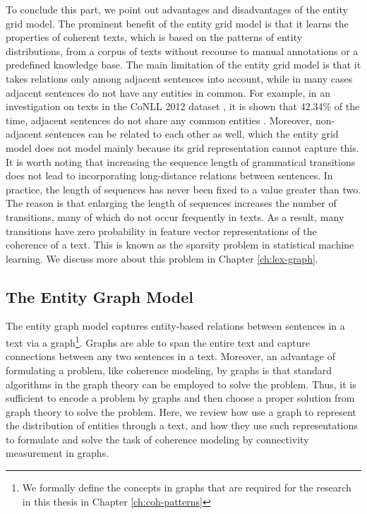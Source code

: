 To conclude this part, we point out advantages and disadvantages of the entity grid model. 
The prominent benefit of the entity grid model is that it learns the properties of coherent texts, which is based on the patterns of entity distributions, from a corpus of texts without recourse to manual annotations or a predefined knowledge base.
The main limitation of the entity grid model is that it takes relations only among adjacent sentences into account, while in many cases adjacent sentences do not have any entities in common. 
For example, in an investigation on texts in the CoNLL 2012 dataset \cite{pradhan12}, it is shown that 42.34\% of the time, adjacent sentences do not share any common entities \cite{zhangmuyu15}. 
Moreover, non-adjacent sentences can be related to each other as well, which the entity grid model does not model mainly because its grid representation cannot capture this.  
It is worth noting that increasing the sequence length of grammatical transitions does not lead to incorporating long-distance relations between sentences.  
In practice, the length of sequences has never been fixed to a value greater than two. 
The reason is that enlarging the length of sequences increases the number of transitions, many of which do not occur frequently in texts. 
As a result, many transitions have zero probability in feature vector representations of the coherence of a text. 
This is known as the sparsity problem in statistical machine learning. 
We discuss more about this problem in Chapter \ref{ch:lex-graph}. 

\subsection{The Entity Graph Model}
\label{sec:ent_graph}

The entity graph model \cite{guinaudeau13} captures entity-based relations between sentences in a text via a graph\footnote{We formally define the concepts in graphs that are required for the research in this thesis in Chapter \ref{ch:coh-patterns}}. 
Graphs are able to span the entire text and capture connections between any two sentences in a text. 
Moreover, an advantage of formulating a problem, like coherence modeling, by graphs is that standard algorithms in the graph theory can be employed to solve the problem. 
Thus, it is sufficient to encode a problem by graphs and then choose a proper solution from graph theory to solve the problem. 
Here, we review how  use a graph to represent the distribution of entities through a text, and how they use such representations to formulate and solve the task of coherence modeling by connectivity measurement in graphs.  

